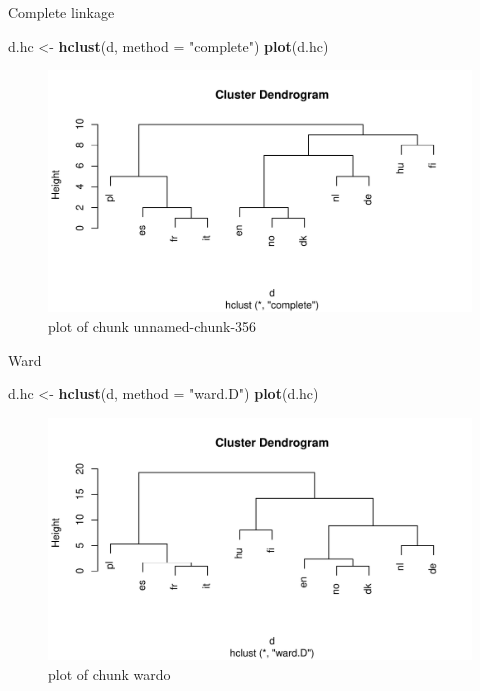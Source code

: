 \documentclass[ignorenonframetext,]{beamer}
\newenvironment{Shaded}{\begin{snugshade}}{\end{snugshade}}
\newcommand{\DataTypeTok}[1]{\textcolor[rgb]{0.13,0.29,0.53}{#1}}
\newcommand{\KeywordTok}[1]{\textcolor[rgb]{0.13,0.29,0.53}{\textbf{#1}}}
\newcommand{\NormalTok}[1]{#1}
\newcommand{\StringTok}[1]{\textcolor[rgb]{0.31,0.60,0.02}{#1}}
\begin{document}
\begin{frame}[fragile]{Complete linkage}
\protect\hypertarget{complete-linkage-1}{}

\begin{Shaded}
\begin{Highlighting}[]
\NormalTok{d.hc <-}\StringTok{ }\KeywordTok{hclust}\NormalTok{(d, }\DataTypeTok{method =} \StringTok{"complete"}\NormalTok{)}
\KeywordTok{plot}\NormalTok{(d.hc)}
\end{Highlighting}
\end{Shaded}

\begin{figure}
\centering
\includegraphics{figure/unnamed-chunk-356-1.pdf}
\caption{plot of chunk unnamed-chunk-356}
\end{figure}

\end{frame}

\begin{frame}[fragile]{Ward}
\protect\hypertarget{ward}{}

\begin{Shaded}
\begin{Highlighting}[]
\NormalTok{d.hc <-}\StringTok{ }\KeywordTok{hclust}\NormalTok{(d, }\DataTypeTok{method =} \StringTok{"ward.D"}\NormalTok{)}
\KeywordTok{plot}\NormalTok{(d.hc)}
\end{Highlighting}
\end{Shaded}

\begin{figure}
\centering
\includegraphics{figure/wardo-1.pdf}
\caption{plot of chunk wardo}
\end{figure}

\end{frame}
\end{document}
